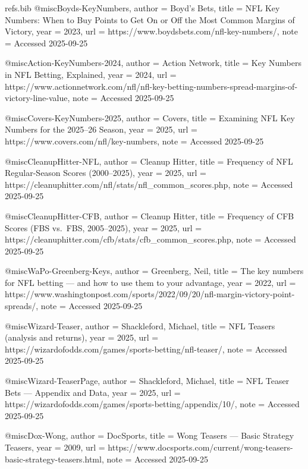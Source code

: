 \documentclass[11pt]{amsart}
\begin{document}
\begin{filecontents*}{refs.bib}
@misc{Boyds-KeyNumbers,
  author = {{Boyd's Bets}},
  title  = {NFL Key Numbers: When to Buy Points to Get On or Off the Most Common Margins of Victory},
  year   = {2023},
  url    = {https://www.boydsbets.com/nfl-key-numbers/},
  note   = {Accessed 2025-09-25}
}

@misc{Action-KeyNumbers-2024,
  author = {{Action Network}},
  title  = {Key Numbers in NFL Betting, Explained},
  year   = {2024},
  url    = {https://www.actionnetwork.com/nfl/nfl-key-betting-numbers-spread-margins-of-victory-line-value},
  note   = {Accessed 2025-09-25}
}

@misc{Covers-KeyNumbers-2025,
  author = {{Covers}},
  title  = {Examining NFL Key Numbers for the 2025--26 Season},
  year   = {2025},
  url    = {https://www.covers.com/nfl/key-numbers},
  note   = {Accessed 2025-09-25}
}

@misc{CleanupHitter-NFL,
  author = {{Cleanup Hitter}},
  title  = {Frequency of NFL Regular-Season Scores (2000--2025)},
  year   = {2025},
  url    = {https://cleanuphitter.com/nfl/stats/nfl_common_scores.php},
  note   = {Accessed 2025-09-25}
}

@misc{CleanupHitter-CFB,
  author = {{Cleanup Hitter}},
  title  = {Frequency of CFB Scores (FBS vs.\ FBS, 2005--2025)},
  year   = {2025},
  url    = {https://cleanuphitter.com/cfb/stats/cfb_common_scores.php},
  note   = {Accessed 2025-09-25}
}

@misc{WaPo-Greenberg-Keys,
  author = {Greenberg, Neil},
  title  = {The key numbers for NFL betting --- and how to use them to your advantage},
  year   = {2022},
  url    = {https://www.washingtonpost.com/sports/2022/09/20/nfl-margin-victory-point-spreads/},
  note   = {Accessed 2025-09-25}
}

@misc{Wizard-Teaser,
  author = {Shackleford, Michael},
  title  = {NFL Teasers (analysis and returns)},
  year   = {2025},
  url    = {https://wizardofodds.com/games/sports-betting/nfl-teaser/},
  note   = {Accessed 2025-09-25}
}

@misc{Wizard-TeaserPage,
  author = {Shackleford, Michael},
  title  = {NFL Teaser Bets --- Appendix and Data},
  year   = {2025},
  url    = {https://wizardofodds.com/games/sports-betting/appendix/10/},
  note   = {Accessed 2025-09-25}
}

@misc{Dox-Wong,
  author = {{DocSports}},
  title  = {Wong Teasers --- Basic Strategy Teasers},
  year   = {2009},
  url    = {https://www.docsports.com/current/wong-teasers-basic-strategy-teasers.html},
  note   = {Accessed 2025-09-25}
}


\end{filecontents*}
\end{document}
